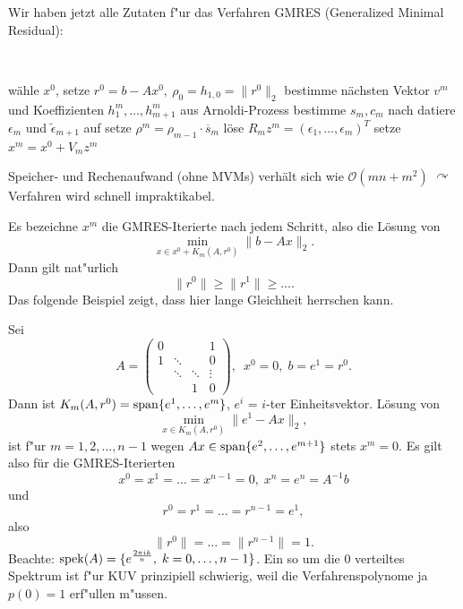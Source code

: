 Wir haben jetzt alle Zutaten f"ur das Verfahren
GMRES (Generalized Minimal Residual):

\clearpage


\begin{alg} \label{GMRES_alg}
~               %
\vspace*{-2\baselineskip}       %
\begin{algorithm}
  \begin{algorithmic}
    \STATE w\"ahle $x^0$, setze $r^0 = b-Ax^0,\ \rho_0=h_{1,0}=\|r^0\|_2 $
      \STATE bestimme n\"achsten Vektor $v^m$ und Koeffizienten
    $h_1^m, \ldots ,h_{m+1}^m$ aus Arnoldi-Prozess
      \STATE bestimme $s_m,c_m$ nach 
      \STATE datiere $\epsilon_m$ und $\tilde{\epsilon}_{m+1}$ auf
      \STATE setze $\rho^m = \rho_{m-1}\cdot \overline{s}_m $
             \enspace {} 
          \STATE l\"ose $R_{m} z^{m} =  \left( \epsilon_1, \ldots, \epsilon_m \right)^T$
          \STATE setze $x^{m} = x^0 + V_{m} z^{m}$
      \ENDIF
    \ENDFOR
  \end{algorithmic}
\end{algorithm}
\end{alg}

\begin{bem}
 Speicher- und Rechenaufwand (ohne MVMs) verh\"alt sich wie $\mathcal{O}(mn + m^2)$
 $\curvearrowright$ Verfahren wird schnell impraktikabel.
\end{bem}
Es bezeichne $x^m$ die GMRES-Iterierte nach jedem Schritt, also die L\"osung
von $$\min\limits_{x \in x^0+K_m(A,r^0)} \|b-Ax\|_2. $$
Dann gilt nat"urlich $$ \|r^0\|\geq\|r^1\|\geq \ldots .$$
Das folgende Beispiel zeigt, dass hier lange Gleichheit herrschen kann.

\begin{bsp} \label{stagnation_bsp}
Sei
\[
 A = \left(\begin{array}{cccc}
                        0 &        & & 1\\
                        1 & \ddots & & 0\\
                          & \ddots & \ddots & \vdots \\
                          & & 1 & 0
               \end{array}\right),\enspace x^0=0,\;  b=e^1=r^0.
\]
Dann ist $K_m(A,r^0)=  \operatorname{span}\{e^1,\ldots,e^m\}$, $e^i$ = $i$-ter Einheitsvektor.
L\"osung von  
$$\min\limits_{x \in K_m(A,r^0)} \|e^1-Ax\|_2, $$
ist f"ur $m=1,2,\ldots,n-1$ wegen
$Ax\in  \operatorname{span}\{e^2,\ldots,e^{m+1}\}$ stets $x^m=0$.
Es gilt also f\"ur die GMRES-Iterierten
$$ x^0=x^1=\ldots=x^{n-1}=0,\; x^n=e^n = A^{-1}b $$ und 
$$ r^0=r^1=\ldots=r^{n-1}=e^1, $$
also
$$\|r^0\|=\ldots=\|r^{n-1}\|=1. $$
Beachte: $\operatorname{spek}(A)=\{ e^{\frac{2\pi ik}{n}} , \;  k=0,\ldots,n-1\} $. Ein so
um die 0 verteiltes Spektrum ist f"ur KUV prinzipiell schwierig, weil die
Verfahrenspolynome ja $p(0) = 1$ erf"ullen m"ussen.
\end{bsp}

